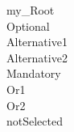\noindent
\unfold\blank\myPlus my\_Root\\
\tab\unfold\optional\myPlus Optional\\
\tab\tab\nofold\Alternative\myMinus Alternative1\\
\tab\tab\nofold\Alternative\myPlusblank Alternative2\\
\tab\unfold\mandatory\myPlus Mandatory\\
\tab\tab\nofold\myOr\myPlus Or1\\
\tab\tab\nofold\myOr\myMinusblank Or2\\
\tab\nofold\optional\myBox notSelected\\
